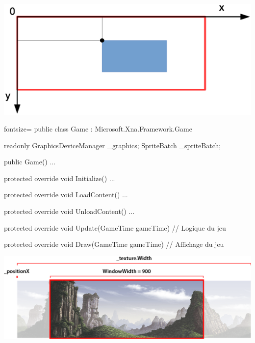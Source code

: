 \documentclass[12pt]{beamer}
\begin{document}
\begin{frame}
    \vspace{1cm}
    \begin{center}
        \includegraphics[scale=0.44]{img/xna-axis.eps}
    \end{center}
\end{frame}

\begin{frame}[fragile]
    \begin{csharpcode*}{fontsize=\scriptsize}
        public class Game : Microsoft.Xna.Framework.Game
        {
            readonly GraphicsDeviceManager _graphics;
            SpriteBatch _spriteBatch;

            public Game() { ... }

            protected override void Initialize() { ... }

            protected override void LoadContent() { ... }

            protected override void UnloadContent() { ... }

            protected override void Update(GameTime gameTime)
            {
                // Logique du jeu
            }

            protected override void Draw(GameTime gameTime)
            {
                // Affichage du jeu
            }
        }
    \end{csharpcode*}
\end{frame}

\begin{frame}
    \begin{center}
        \vspace{1cm}
        \includegraphics[scale=0.26]{img/bg1.png}
    \end{center}
\end{frame}
\end{document}

